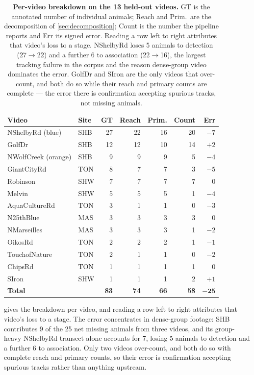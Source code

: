 \begin{table}[t]
\centering\small
\setlength{\tabcolsep}{4pt}
\begin{tabular}{llrrrrr}
\toprule
Video & Site & GT & Reach & Prim. & Count & Err \\
\midrule
NShelbyRd (blue) & SHB & 27 & 22 & 16 & 20 & $-7$ \\
GolfDr & SHB & 12 & 12 & 10 & 14 & $+2$ \\
NWolfCreek (orange) & SHB & 9 & 9 & 9 & 5 & $-4$ \\
GiantCityRd & TON & 8 & 7 & 7 & 3 & $-5$ \\
Robinson & SHW & 7 & 7 & 7 & 7 & $0$ \\
Melvin & SHW & 5 & 5 & 5 & 1 & $-4$ \\
AquaCultureRd & TON & 3 & 1 & 1 & 0 & $-3$ \\
N25thBlue & MAS & 3 & 3 & 3 & 3 & $0$ \\
NMarseilles & MAS & 3 & 3 & 3 & 1 & $-2$ \\
OikosRd & TON & 2 & 2 & 2 & 1 & $-1$ \\
TouchofNature & TON & 2 & 1 & 1 & 0 & $-2$ \\
ChipsRd & TON & 1 & 1 & 1 & 1 & $0$ \\
SIron & SHW & 1 & 1 & 1 & 2 & $+1$ \\
\midrule
\textbf{Total} & & \textbf{83} & \textbf{74} & \textbf{66} & \textbf{58} & $\mathbf{-25}$ \\
\bottomrule
\end{tabular}
\caption{\textbf{Per-video breakdown on the 13 held-out videos.} GT is the annotated number
of individual animals; Reach and Prim.\ are the decomposition of \cref{sec:decomposition};
Count is the number the pipeline reports and Err its signed error. Reading a row left to
right attributes that video's loss to a stage. NShelbyRd loses 5 animals to detection
(27$\to$22) and a further 6 to association (22$\to$16), the largest tracking failure in the
corpus and the reason dense-group video dominates the error. GolfDr and SIron are the only
videos that over-count, and both do so while their reach and primary counts are complete ---
the error there is confirmation accepting spurious tracks, not missing animals.}
\label{tab:pervideo}
\end{table}

 gives the breakdown per video, and reading a row left to right
attributes that video's loss to a stage. The error concentrates in dense-group footage: SHB
contributes 9 of the 25 net missing animals from three videos, and its group-heavy NShelbyRd
transect alone accounts for 7, losing 5 animals to detection and a further 6 to association.
Only two videos over-count, and both do so with complete reach and primary counts, so their
error is confirmation accepting spurious tracks rather than anything upstream.

